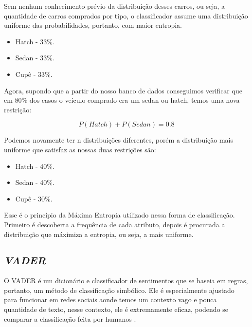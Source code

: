 Sem nenhum conhecimento prévio da distribuição desses carros, ou seja, a
quantidade de carros comprados por tipo, o classificador assume uma distribuição
uniforme das probabilidades, portanto, com maior entropia.

\begin{itemize}
  \item Hatch - 33\%.
  \item Sedan - 33\%.
  \item Cupê - 33\%.
\end{itemize}

Agora, supondo que a partir do nosso banco de dados conseguimos verificar que em
80\% dos casos o veículo comprado era um sedan ou hatch, temos uma nova
restrição:

\[ P(Hatch) + P (Sedan) = 0.8 \]

Podemos novamente ter n distribuições diferentes, porém a distribuição mais
uniforme que satisfaz as nossas duas restrições são:

\begin{itemize}
  \item Hatch - 40\%.
  \item Sedan - 40\%.
  \item Cupê - 30\%.
\end{itemize}

Esse é o princípio da Máxima Entropia utilizado nessa forma de classificação.
Primeiro é descoberta a frequência de cada atributo, depois é procurada a
distribuição que máximiza a entropia, ou seja, a mais uniforme.








\subsection{\textit{VADER}}

O \ac{VADER} é um dicionário e classificador de sentimentos que se baseia em
regras, portanto, um método de classificação simbólico. Ele é especialmente
ajustado para funcionar em redes sociais aonde temos um contexto vago e pouca
quantidade de texto, nesse contexto, ele é extremamente eficaz, podendo se
comparar a classificação feita por humanos \cite{conf/icwsm/HuttoG14}.

